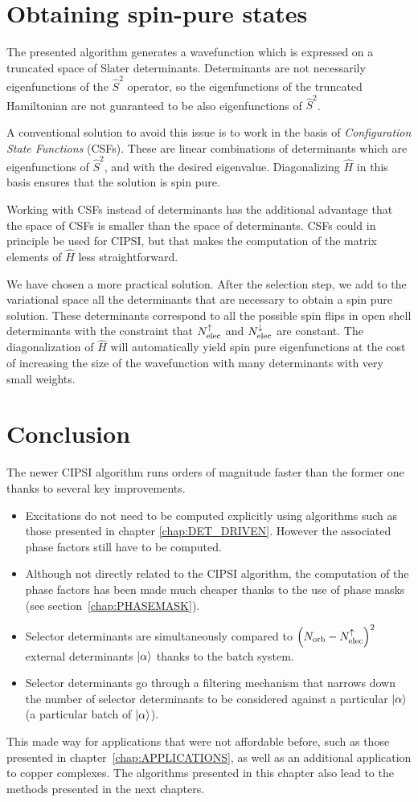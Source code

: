 \documentclass[./thesis.tex]{subfiles}
\begin{document}
\section{Obtaining spin-pure states}
\label{sec:cipsi_s2}

The presented algorithm generates a wavefunction which is expressed on a truncated space of Slater determinants. Determinants are not necessarily eigenfunctions of the $\widehat S^2$ operator, so the eigenfunctions of the truncated Hamiltonian are not guaranteed to be also eigenfunctions of $\widehat S^2$.

A conventional solution to avoid this issue is to work in the basis of \emph{Configuration State Functions} (CSFs). These are linear combinations of determinants which are eigenfunctions of $\widehat S^2$, and with the desired eigenvalue. Diagonalizing $\widehat H$ in this basis ensures that the solution is spin pure.

Working with CSFs instead of determinants has the additional advantage that the space of CSFs is smaller than the space of determinants. CSFs could in principle be used for CIPSI, but that makes the computation of the matrix elements of $\widehat H$ less straightforward.

We have chosen a more practical solution.\cite{Bytautas_2009} After the selection step, we add to the variational space all the determinants that are necessary to obtain a spin pure solution. These determinants correspond to all the possible spin flips in open shell determinants with the constraint that ${N_\text{elec}^{\uparrow}}$ and ${N_\text{elec}^{\downarrow}}$ are constant. The diagonalization of $\widehat H$ will automatically yield spin pure eigenfunctions at the cost of increasing the size of the wavefunction with many determinants with very small weights.

\section{Conclusion}

The newer CIPSI algorithm runs orders of magnitude faster than the former one thanks to several key improvements.
\begin{itemize}
\item
Excitations do not need to be computed explicitly using algorithms such as those presented in chapter \ref{chap:DET_DRIVEN}. However the associated phase factors still have to be computed.
\item
Although not directly related to the CIPSI algorithm, the computation of the phase factors has been made much cheaper thanks to the use of phase masks (see section~\ref{chap:PHASEMASK}).
\item
Selector determinants are simultaneously compared to $\qty({N_\text{orb}}-{N_\text{elec}^{\uparrow}})^2$ external determinants ${\ket{\alpha}}$ thanks to the batch system.
\item
Selector determinants go through a filtering mechanism that narrows down the number of selector determinants to be considered against a particular ${\ket{\alpha}}$ (a particular batch of ${\ket{\alpha}}$).
\end{itemize}

This made way for applications that were not affordable before, such as those presented in chapter~\ref{chap:APPLICATIONS}, as well as an additional application to copper complexes.\cite{1806.05115}
The algorithms presented in this chapter also lead to the methods presented in the next chapters.
\end{document}
